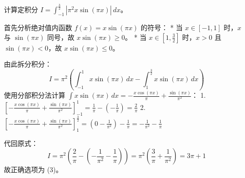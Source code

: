 \begin{questions}
    \question
计算定积分 $I = \int_{-1}^{\frac{3}{2}} |\pi^2 x \sin(\pi x)| \,dx$。

\begin{solution}
首先分析绝对值内函数 $f(x) = x \sin(\pi x)$ 的符号：
* 当 $x \in [-1, 1]$ 时，$x$ 与 $\sin(\pi x)$ 同号，故 $x \sin(\pi x) \ge 0$。
* 当 $x \in [1, \frac{3}{2}]$ 时，$x > 0$ 且 $\sin(\pi x) < 0$，故 $x \sin(\pi x) \le 0$。

由此拆分积分：
\[
I = \pi^2 \left( \int_{-1}^{1} x \sin(\pi x) \,dx - \int_{1}^{\frac{3}{2}} x \sin(\pi x) \,dx \right)
\]
使用分部积分法计算 $\int x \sin(\pi x) \,dx = -\frac{x \cos(\pi x)}{\pi} + \frac{\sin(\pi x)}{\pi^2}$：
1. $\left[ -\frac{x \cos(\pi x)}{\pi} + \frac{\sin(\pi x)}{\pi^2} \right]_{-1}^{1} = \frac{1}{\pi} - (-\frac{1}{\pi}) = \frac{2}{\pi}$
2. $\left[ -\frac{x \cos(\pi x)}{\pi} + \frac{\sin(\pi x)}{\pi^2} \right]_{1}^{\frac{3}{2}} = (0 - \frac{1}{\pi^2}) - \frac{1}{\pi} = -\frac{1}{\pi^2} - \frac{1}{\pi}$

代回原式：
\[
I = \pi^2 \left( \frac{2}{\pi} - (-\frac{1}{\pi^2} - \frac{1}{\pi}) \right) = \pi^2 \left( \frac{3}{\pi} + \frac{1}{\pi^2} \right) = 3\pi + 1
\]
故正确选项为 (3)。
\end{solution}


\end{questions}

